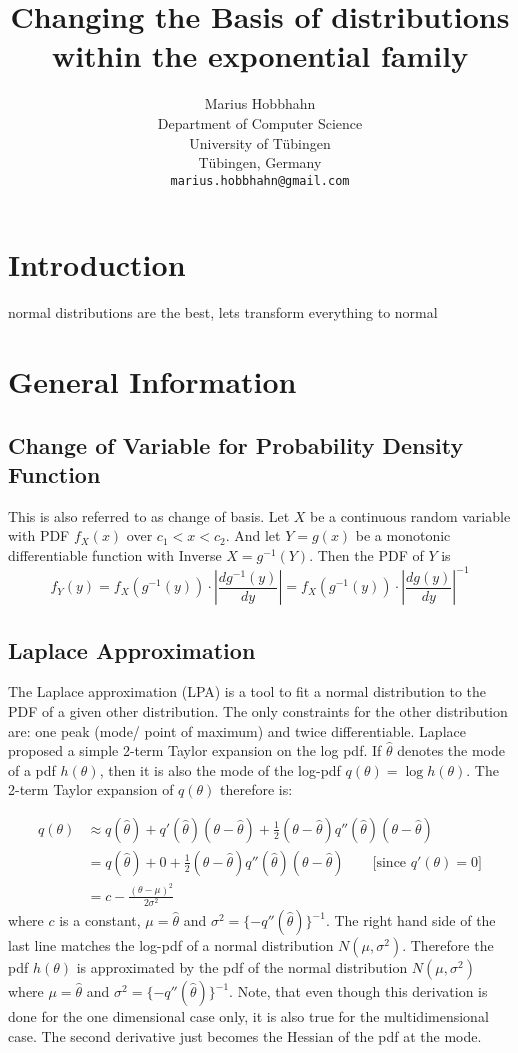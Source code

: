 \documentclass{article}
\title{Changing the Basis of distributions within the exponential family}
\author{%
  Marius Hobbhahn \\
  Department of Computer Science\\
  University of Tübingen\\
  Tübingen, Germany \\
  \texttt{marius.hobbhahn@gmail.com} \\
}
\begin{document}
\maketitle

\section{Introduction}

normal distributions are the best, lets transform everything to normal

\section{General Information}

\subsection{Change of Variable for Probability Density Function}
\label{subsec:variable_change_pdf}

This is also referred to as change of basis. Let $X$ be a continuous random variable with PDF $f_X(x)$ over $c_1 < x < c_2$. And let $Y = g(x)$ be a monotonic differentiable function with Inverse $X = g^{-1}(Y)$. Then the PDF of $Y$ is
$$f_Y(y) = f_X(g^{-1}(y)) \cdot \left | \frac{d g^{-1}(y)}{dy} \right| 
= f_X(g^{-1}(y)) \cdot \left | \frac{d g(y)}{dy} \right|^{-1} $$

\subsection{Laplace Approximation}

The Laplace approximation (LPA) is a tool to fit a normal distribution to the PDF of a given other distribution. The only constraints for the other distribution are: one peak (mode/ point of maximum) and twice differentiable. Laplace proposed a simple 2-term Taylor expansion on the log pdf. If $\hat{\theta}$ denotes the mode of a pdf $h(\theta)$, then it is also the mode of the log-pdf $q(\theta) = \log h(\theta)$. The 2-term Taylor expansion of $q(\theta)$ therefore is:

\begin{align}
	q(\theta) &\approx q(\hat{\theta}) + q'(\hat{\theta})(\theta - \hat{\theta}) + \frac{1}{2}(\theta- \hat{\theta})q''(\hat{\theta}) (\theta - \hat{\theta})\\
	&= 	q(\hat{\theta}) + 0 +  \frac{1}{2}(\theta- \hat{\theta})q''(\hat{\theta}) (\theta - \hat{\theta}) \qquad \text{[since } q'(\theta) = 0]\\
	&= c - \frac{(\theta - \mu)^2}{2\sigma^2}
\end{align}
where $c$ is a constant, $\mu = \hat{\theta}$ and $\sigma^2 = \{-q''(\hat{\theta})\}^{-1}$. The right hand side of the last line matches the log-pdf of a normal distribution $N(\mu, \sigma^2)$. Therefore the pdf $h(\theta)$ is approximated by the pdf of the normal distribution $N(\mu, \sigma^2)$ where $\mu = \hat{\theta}$ and $\sigma^2 = \{-q''(\hat{\theta})\}^{-1}$. Note, that even though this derivation is done for the one dimensional case only, it is also true for the multidimensional case. The second derivative just becomes the Hessian of the pdf at the mode.
\end{document}
